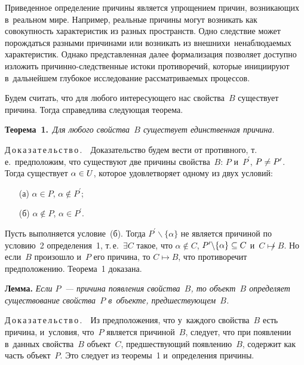 \begin{multicols}{2}
  Приведенное определение причины является упрощением причин, 
возникающих в~реальном мире. Например, реальные причины могут возникать\linebreak 
как совокупность характеристик из разных пространств. Одно следствие может 
порождаться разными причинами или возникать из внешних\linebreak и~ненаблюдаемых 
характеристик. Однако пред\-став\-лен\-ная далее формализация позволяет доступно 
изложить при\-чин\-но-след\-ст\-вен\-ные истоки противоречий, которые 
инициируют в~дальнейшем глубокое исследование рассматриваемых процессов.
  
  Будем считать, что для любого интересующего нас свойства~$B$ существует 
причина. Тогда справедлива следующая теорема.
  
  \smallskip
  
  \noindent
  \textbf{Теорема~1.}\ \textit{Для любого свойства~$B$ существует 
единственная причина}. 
  
  \smallskip
  
  \noindent
  Д\,о\,к\,а\,з\,а\,т\,е\,л\,ь\,с\,т\,в\,о\,.\ \ Доказательство будем вести от противного, 
т.\,е.\ предположим, что существуют две причины свойства~$B$: $P$ 
и~$P^\prime$, $P\hm\not= P^\prime$. Тогда существует $\alpha\hm\in U$, которое 
удовлетворяет одному из двух условий:
  \begin{itemize}
\item[(а)] $\alpha\in P$, $\alpha\notin P^\prime$;
\item[(б)] $\alpha\notin P$, $\alpha \in P^\prime$.
\end{itemize}

  Пусть выполняется условие~(б). Тогда $P^\prime\backslash \{\alpha\}$ не 
является причиной по условию~2 определения~1, т.\,е.\ $\exists C$ такое, что 
$\alpha\notin C$, $P^\prime\backslash \{\alpha\}\hm\subseteq C$ и~$C\not\mapsto B$. 
Но если~$B$ произошло и~$P$ его причина, то $C\mapsto B$, что противоречит 
предположению. Теорема~1 доказана.
  
  \smallskip
  
  \noindent
  \textbf{Лемма.} \textit{Если $P$~--- причина появления свойства~$B$, то 
объект~$B$ определяет существование свойства~$P$ в~объекте, 
предшествующем~$B$. }
  
  \smallskip
  
  \noindent
  Д\,о\,к\,а\,з\,а\,т\,е\,л\,ь\,с\,т\,в\,о\,.\ \ Из предположения, что у~каж\-до\-го 
свойства~$B$ есть причина, и~условия, что~$P$ является причиной~$B$, следует, 
что при появлении в~данных свойства~$B$ объект~$C$, предшествующий 
появлению~$B$, содержит как часть объект~$P$. Это следует из теоремы~1 
и~определения причины. 
  

\end{multicols}
